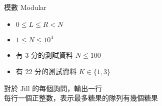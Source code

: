 \begin{problem}{模數 Modular}
\begin{iofmt}
\begin{itemize}
	\item $0 \leq L \leq R < N$
	\item $1 \leq N \leq 10^4$
	\item 有 3 分的測試資料 $N \leq 100$
	\item 有 22 分的測試資料 $K \in \{1,3\}$
\end{itemize}
\end{iofmt}

\OutputFile

對於 Jill 的每個詢問，輸出一行\\
每行一個正整數，表示最多糖果的隊列有幾個糖果

\Examples

\begin{example}
\end{example}

\end{problem}
